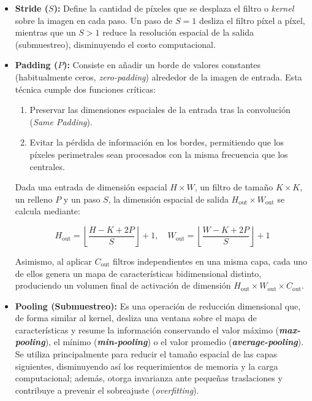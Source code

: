 \begin{itemize}
    \item \textbf{Stride ($S$):} Define la cantidad de píxeles que se desplaza el filtro o \textit{kernel} sobre la imagen en cada paso. Un paso de $S = 1$ desliza el filtro píxel a píxel, mientras que un $S > 1$ reduce la resolución espacial de la salida (submuestreo), disminuyendo el costo computacional.

    \item \textbf{Padding ($P$):} Consiste en añadir un borde de valores constantes (habitualmente ceros, \textit{zero-padding}) alrededor de la imagen de entrada. Esta técnica cumple dos funciones críticas:
    \begin{enumerate}
        \item Preservar las dimensiones espaciales de la entrada tras la convolución (\textit{Same Padding}).
        \item Evitar la pérdida de información en los bordes, permitiendo que los píxeles perimetrales sean procesados con la misma frecuencia que los centrales.
    \end{enumerate}

    Dada una entrada de dimensión espacial $H \times W$, un filtro de tamaño $K \times K$, un relleno $P$ y un paso $S$, la dimensión espacial de salida $H_{\text{out}} \times W_{\text{out}}$ se calcula mediante:

    \begin{equation}
        H_{\text{out}} = \left\lfloor \frac{H - K + 2P}{S} \right\rfloor + 1, \quad W_{\text{out}} = \left\lfloor \frac{W - K + 2P}{S} \right\rfloor + 1
    \end{equation}

    Asimismo, al aplicar $C_{\text{out}}$ filtros independientes en una misma capa, cada uno de ellos genera un mapa de características bidimensional distinto, produciendo un volumen final de activación de dimensión $H_{\text{out}} \times W_{\text{out}} \times C_{\text{out}}$.

    \item \textbf{Pooling (Submuestreo):} Es una operación de reducción dimensional que, de forma similar al kernel, desliza una ventana sobre el mapa de características y resume la información conservando el valor máximo (\textbf{\textit{max-pooling}}), el mínimo (\textbf{\textit{min-pooling}}) o el valor promedio (\textbf{\textit{average-pooling}}). Se utiliza principalmente para reducir el tamaño espacial de las capas siguientes, disminuyendo así los requerimientos de memoria y la carga computacional; además, otorga invarianza ante pequeñas traslaciones y contribuye a prevenir el sobreajuste (\textit{overfitting}).
\end{itemize}


